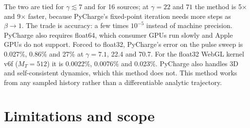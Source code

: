 \documentclass[11pt, a4paper]{article}
\begin{document}
The two are tied for $\gamma \lesssim 7$ and for 16 sources; at $\gamma = 22$ and $71$ the method is 5$\times$ and 9$\times$ faster, because PyCharge's fixed-point iteration needs more steps as $\beta \to 1$. The trade is accuracy: a few times $10^{-5}$ instead of machine precision. PyCharge also requires float64, which consumer GPUs run slowly and Apple GPUs do not support. Forced to float32, PyCharge's error on the pulse sweep is 0.027\%, 0.86\% and 27\% at $\gamma = 7.1$, 22.4 and 70.7. For the float32 WebGL kernel v6f ($M_T = 512$) it is 0.0022\%, 0.0076\% and 0.023\%. PyCharge also handles 3D and self-consistent dynamics, which this method does not. This method works from any sampled history rather than a differentiable analytic trajectory.

\section{Limitations and scope}
\end{document}
